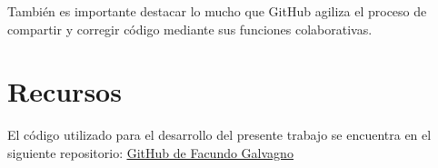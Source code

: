 \documentclass{article}
\begin{document}
También es importante destacar lo mucho que GitHub agiliza el proceso de compartir y corregir código mediante sus funciones
colaborativas.

\section{Recursos}
\label{section:5}
El código utilizado para el desarrollo del presente trabajo se encuentra en el siguiente repositorio:
\underline{\href{https://github.com/FGalvagno/sistemas-de-control}{GitHub de Facundo Galvagno}}
\end{document}
